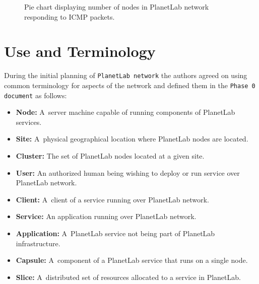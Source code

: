 \begin{figure}[H]
	\centering
	\caption{Pie chart displaying number of nodes in PlanetLab network responding to ICMP packets.}
	\label{fig:pingablepie}
\end{figure}

\section{Use and Terminology}
\label{section:terminology}
During the initial planning of \texttt{PlanetLab network} the authors agreed on using common terminology for aspects of the network and defined them in the \texttt{Phase 0 document} \cite{Roscoe_PDN-02-002} as follows:
\begin{itemize}
	\item \textbf{Node:} A~server machine capable of running components of PlanetLab services.
	\item \textbf{Site:} A~physical geographical location where PlanetLab nodes are located.
	\item \textbf{Cluster:} The set of PlanetLab nodes located at a given site.
	\item \textbf{User:} An authorized human being wishing to deploy or run service over PlanetLab network.
	\item \textbf{Client:} A~client of a service running over PlanetLab network.
	\item \textbf{Service:} An application running over PlanetLab network.
	\item \textbf{Application:} A~PlanetLab service not being part of PlanetLab infrastructure. 
	\item \textbf{Capsule:} A~component of a PlanetLab service that runs on a single node.
	\item \textbf{Slice:} A~distributed set of resources allocated to a service in PlanetLab.
\end{itemize}
